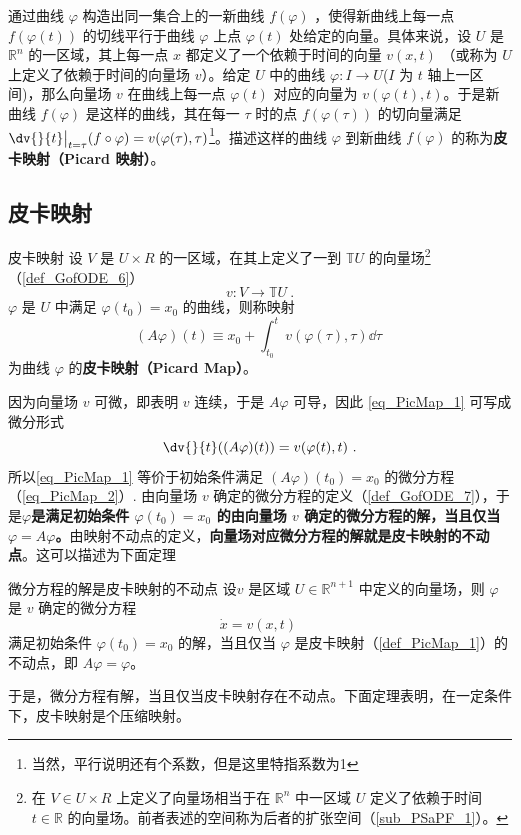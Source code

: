 
\cite{Arnold}通过曲线 $\varphi$ 构造出同一集合上的一新曲线 $f(\varphi)$ ，使得新曲线上每一点 $f(\varphi(t))$ 的切线平行于曲线 $\varphi$ 上点 $\varphi(t)$ 处给定的向量。具体来说，设 $U$ 是 $\mathbb R^n$ 的一区域，其上每一点 $x$ 都定义了一个依赖于时间的向量 $v(x,t)$ （或称为 $U$ 上定义了依赖于时间的向量场 $v$）。给定 $U$ 中的曲线 $\varphi:I\rightarrow U$($I$ 为 $t$ 轴上一区间)，那么向量场 $v$ 在曲线上每一点 $\varphi(t)$ 对应的向量为 $v(\varphi(t),t)$。于是新曲线 $f(\varphi)$ 是这样的曲线，其在每一 $\tau$ 时的点 $f(\varphi(\tau))$ 的切向量满足 $\dv{}{t}\big|_{t=\tau}(f\circ \varphi)=v(\varphi(\tau),\tau)$\footnote{当然，平行说明还有个系数，但是这里特指系数为1}。描述这样的曲线 $\varphi$ 到新曲线 $f(\varphi)$ 的称为\textbf{皮卡映射（Picard 映射）}。
\subsection{皮卡映射}
\begin{definition}{皮卡映射}\label{def_PicMap_1}
设 $V$ 是 $U\times R$ 的一区域，在其上定义了一到 $\mathbb TU$ 的向量场\footnote{在 $V\in U\times R$ 上定义了向量场相当于在 $\mathbb R^n$ 中一区域 $U$ 定义了依赖于时间 $t\in\mathbb R$ 的向量场。前者表述的空间称为后者的扩张空间（\autoref{sub_PSaPF_1}）。}（\autoref{def_GofODE_6}） 
\begin{equation}
v:V\rightarrow\mathbb TU~.
\end{equation}
$\varphi$ 是 $U$ 中满足 $\varphi(t_0)=x_0$ 的曲线，则称映射
\begin{equation}\label{eq_PicMap_1}
(A\varphi)(t)\equiv x_0+\int_{t_0}^{t}v(\varphi(\tau),\tau)\dd \tau~
\end{equation}
为曲线 $\varphi$ 的\textbf{皮卡映射（Picard Map）}。
\end{definition}

因为向量场 $v$ 可微，即表明 $v$ 连续，于是 $A\varphi$ 可导，因此 \autoref{eq_PicMap_1} 可写成微分形式
\begin{equation}\label{eq_PicMap_2}
\dv{}{t}((A\varphi)(t))=v(\varphi(t),t)~.
\end{equation}
所以\autoref{eq_PicMap_1} 等价于初始条件满足 $(A\varphi)(t_0)=x_0$ 的微分方程（\autoref{eq_PicMap_2}）. 由向量场 $v$ 确定的微分方程的定义（\autoref{def_GofODE_7}），于是\textbf{$\varphi$是满足初始条件 $\varphi(t_0)=x_0$ 的由向量场 $v$ 确定的微分方程的解，当且仅当 $\varphi=A\varphi$。}由映射不动点的定义，\textbf{向量场对应微分方程的解就是皮卡映射的不动点}。这可以描述为下面定理
\begin{theorem}{微分方程的解是皮卡映射的不动点}\label{the_PicMap_1}
设$v$ 是区域 $U\in\mathbb R^{n+1}$ 中定义的向量场，则 $\varphi$ 是 $v$ 确定的微分方程
\begin{equation}\label{eq_PicMap_3}
\dot x=v(x,t)~
\end{equation}
满足初始条件 $\varphi(t_0)=x_0$ 的解，当且仅当 $\varphi$ 是皮卡映射（\autoref{def_PicMap_1}）的不动点，即 $A\varphi=\varphi$。
\end{theorem}
于是，微分方程有解，当且仅当皮卡映射存在不动点。下面定理表明，在一定条件下，皮卡映射是个压缩映射。


